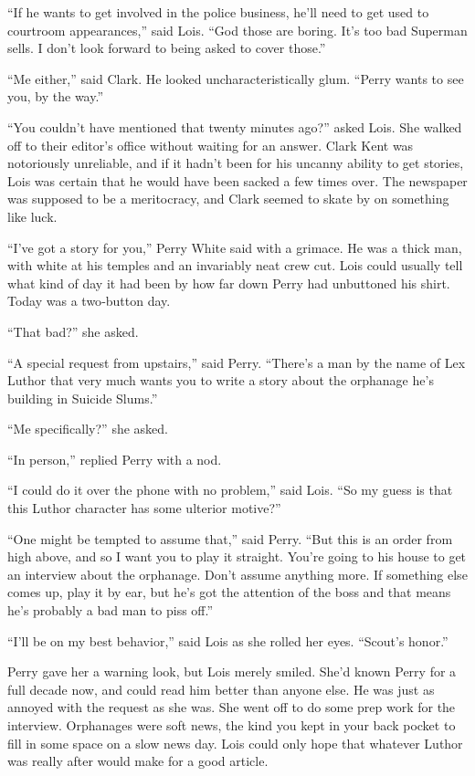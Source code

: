 \documentclass[ebook,12pt]{memoir}
\begin{document}
``If he wants to get involved in the police business, he'll need to get
used to courtroom appearances,'' said Lois. ``God those are boring. It's
too bad Superman sells. I don't look forward to being asked to cover
those.''

``Me either,'' said Clark. He looked uncharacteristically glum. ``Perry
wants to see you, by the way.''

``You couldn't have mentioned that twenty minutes ago?'' asked Lois. She
walked off to their editor's office without waiting for an answer. Clark
Kent was notoriously unreliable, and if it hadn't been for his uncanny
ability to get stories, Lois was certain that he would have been sacked
a few times over. The newspaper was supposed to be a meritocracy, and
Clark seemed to skate by on something like luck.

``I've got a story for you,'' Perry White said with a grimace. He was a
thick man, with white at his temples and an invariably neat crew cut.
Lois could usually tell what kind of day it had been by how far down
Perry had unbuttoned his shirt. Today was a two‐button day.

``That bad?'' she asked.

``A special request from upstairs,'' said Perry. ``There's a man by the
name of Lex Luthor that very much wants you to write a story about the
orphanage he's building in Suicide Slums.''

``Me specifically?'' she asked.

``In person,'' replied Perry with a nod.

``I could do it over the phone with no problem,'' said Lois. ``So my
guess is that this Luthor character has some ulterior motive?''

``One might be tempted to assume that,'' said Perry. ``But this is an
order from high above, and so I want you to play it straight. You're
going to his house to get an interview about the orphanage. Don't assume
anything more. If something else comes up, play it by ear, but he's got
the attention of the boss and that means he's probably a bad man to piss
off.''

``I'll be on my best behavior,'' said Lois as she rolled her eyes.
``Scout's honor.''

Perry gave her a warning look, but Lois merely smiled. She'd known Perry
for a full decade now, and could read him better than anyone else. He
was just as annoyed with the request as she was. She went off to do some
prep work for the interview. Orphanages were soft news, the kind you
kept in your back pocket to fill in some space on a slow news day. Lois
could only hope that whatever Luthor was really after would make for a
good article.
\end{document}
